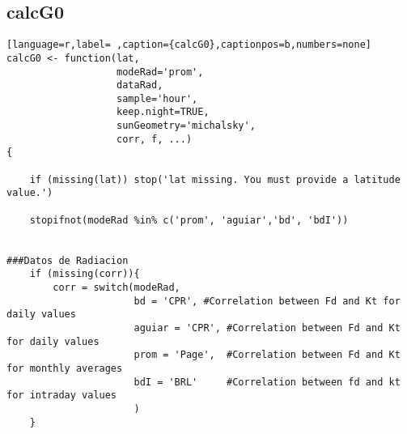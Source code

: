 \subsection{calcG0}
\label{sec:orgafa75d7}
\label{subsec:calcg0}
\begin{lstlisting}[language=r,label= ,caption={calcG0},captionpos=b,numbers=none]
calcG0 <- function(lat,
                   modeRad='prom',
                   dataRad,
                   sample='hour',
                   keep.night=TRUE,
                   sunGeometry='michalsky',
                   corr, f, ...)
{

    if (missing(lat)) stop('lat missing. You must provide a latitude value.')

    stopifnot(modeRad %in% c('prom', 'aguiar','bd', 'bdI'))


###Datos de Radiacion
    if (missing(corr)){
        corr = switch(modeRad,
                      bd = 'CPR', #Correlation between Fd and Kt for daily values
                      aguiar = 'CPR', #Correlation between Fd and Kt for daily values
                      prom = 'Page',  #Correlation between Fd and Kt for monthly averages
                      bdI = 'BRL'     #Correlation between fd and kt for intraday values
                      )
    }


\end{lstlisting}

